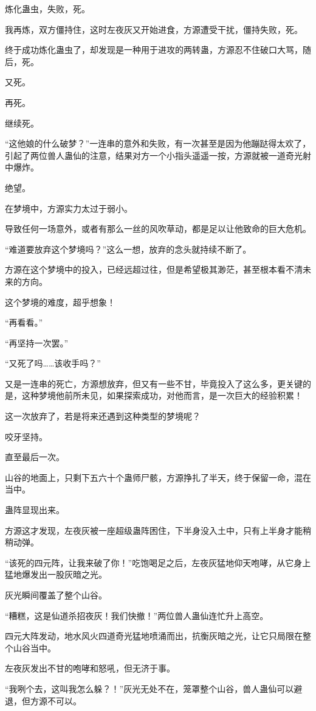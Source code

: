 \begin{this_body}
炼化蛊虫，失败，死。

我再炼，双方僵持住，这时左夜灰又开始进食，方源遭受干扰，僵持失败，死。

终于成功炼化蛊虫了，却发现是一种用于进攻的两转蛊，方源忍不住破口大骂，随后，死。

又死。

再死。

继续死。

“这他娘的什么破梦？”一连串的意外和失败，有一次甚至是因为他蹦跶得太欢了，引起了两位兽人蛊仙的注意，结果对方一个小指头遥遥一按，方源就被一道奇光射中爆炸。

绝望。

在梦境中，方源实力太过于弱小。

导致任何一场意外，或者有那么一丝的风吹草动，都是足以让他致命的巨大危机。

“难道要放弃这个梦境吗？”这么一想，放弃的念头就持续不断了。

方源在这个梦境中的投入，已经远超过往，但是希望极其渺茫，甚至根本看不清未来的方向。

这个梦境的难度，超乎想象！

“再看看。”

“再坚持一次罢。”

“又死了吗……该收手吗？”

又是一连串的死亡，方源想放弃，但又有一些不甘，毕竟投入了这么多，更关键的是，这种梦境他前所未见，如果探索成功，对他而言，是一次巨大的经验积累！

这一次放弃了，若是将来还遇到这种类型的梦境呢？

咬牙坚持。

直至最后一次。

山谷的地面上，只剩下五六十个蛊师尸骸，方源挣扎了半天，终于保留一命，混在当中。

蛊阵显现出来。

方源这才发现，左夜灰被一座超级蛊阵困住，下半身没入土中，只有上半身才能稍稍动弹。

“该死的四元阵，让我来破了你！”吃饱喝足之后，左夜灰猛地仰天咆哮，从它身上猛地爆发出一股灰暗之光。

灰光瞬间覆盖了整个山谷。

“糟糕，这是仙道杀招夜灰！我们快撤！”两位兽人蛊仙连忙升上高空。

四元大阵发动，地水风火四道奇光猛地喷涌而出，抗衡灰暗之光，让它只局限在整个山谷当中。

左夜灰发出不甘的咆哮和怒吼，但无济于事。

“我咧个去，这叫我怎么躲？！”灰光无处不在，笼罩整个山谷，兽人蛊仙可以避退，但方源不可以。


\end{this_body}
